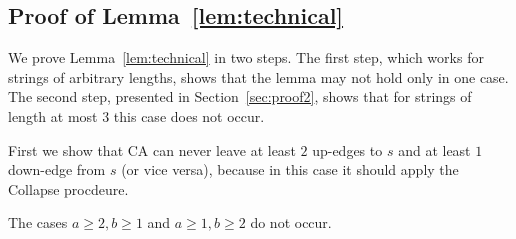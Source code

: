 \subsection{Proof of Lemma~\ref{lem:technical}}
\label{sec:proof1}
We prove Lemma~\ref{lem:technical} in two steps. The first step, which works for strings of arbitrary lengths, shows that the lemma may not hold only in one case. The second step, presented in Section~\ref{sec:proof2}, shows that for strings of length at most $3$ this case does not occur.

First we show that CA can never leave at least $2$ up-edges to $s$ and at least $1$ down-edge from $s$ (or vice versa), because in this case it should apply the Collapse procdeure.
\begin{lemma}
\label{lem:edgecases}
The cases $a \ge 2, b \ge 1$ and $a \ge 1, b \ge 2$ do not occur.
\end{lemma}

